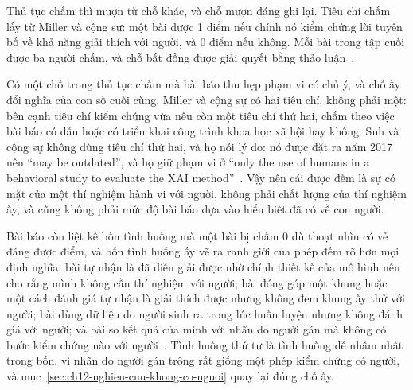 %
Thủ tục chấm thì mượn từ chỗ khác, và chỗ mượn đáng ghi lại. Tiêu chí chấm lấy
từ Miller và cộng sự: một bài được 1 điểm nếu chính nó kiểm chứng lời tuyên bố
về khả năng giải thích với người, và 0 điểm nếu không. Mỗi bài trong tập cuối
được ba người chấm, và chỗ bất đồng được giải quyết bằng thảo
luận~\autocite{p24humangap}.

Có một chỗ trong thủ tục chấm mà bài báo thu hẹp phạm vi có chủ ý, và chỗ ấy
đổi nghĩa của con số cuối cùng. Miller và cộng sự có hai tiêu chí, không phải
một: bên cạnh tiêu chí kiểm chứng vừa nêu còn một tiêu chí thứ hai, chấm theo
việc bài báo có dẫn hoặc có triển khai công trình khoa học xã hội hay không.
Suh và cộng sự không dùng tiêu chí thứ hai, và họ nói lý do: nó được đặt ra
năm 2017 nên \enquote{may be outdated}, và họ giữ phạm vi ở \enquote{only the
use of humans in a behavioral study to evaluate the XAI
method}~\autocite{p24humangap}. Vậy nên cái được đếm là sự có mặt của một thí
nghiệm hành vi với người, không phải chất lượng của thí nghiệm ấy, và cũng
không phải mức độ bài báo dựa vào hiểu biết đã có về con người.

Bài báo còn liệt kê bốn tình huống mà một bài bị chấm 0 dù thoạt nhìn có vẻ
đáng được điểm, và bốn tình huống ấy vẽ ra ranh giới của phép đếm rõ hơn mọi
định nghĩa: bài tự nhận là đã diễn giải được nhờ chính thiết kế của mô hình
nên cho rằng mình không cần thí nghiệm với người; bài đóng góp một khung hoặc
một cách đánh giá tự nhận là giải thích được nhưng không đem khung ấy thử với
người; bài dùng dữ
liệu do người sinh ra trong lúc huấn luyện nhưng không đánh giá với người; và
bài so kết quả của mình với nhãn do người gán mà không có bước kiểm chứng nào
với người~\autocite{p24humangap}. Tình huống thứ tư là tình huống dễ nhầm nhất
trong bốn, vì nhãn do người gán trông rất giống một phép kiểm chứng có người,
và mục~\ref{sec:ch12-nghien-cuu-khong-co-nguoi} quay lại đúng chỗ ấy.
